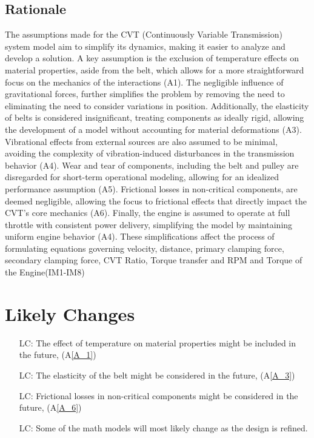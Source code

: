 \documentclass[12pt]{article}
\newcounter{lcnum} %
\begin{document}
\subsection{Rationale}

The assumptions made for the CVT (Continuously Variable Transmission) system model aim to simplify its dynamics, making it easier to analyze and develop a solution. 
A key assumption is the exclusion of temperature effects on material properties, aside from the belt, which allows for a more straightforward focus on the mechanics of the interactions (A1). 
The negligible influence of gravitational forces, further simplifies the problem by removing the need to eliminating the need to consider variations in position. 
Additionally, the elasticity of belts is considered insignificant, treating components as ideally rigid, allowing the development of a model without accounting for material deformations (A3). 
Vibrational effects from external sources are also assumed to be minimal, avoiding the complexity of vibration-induced disturbances in the transmission behavior (A4). 
Wear and tear of components, including the belt and pulley are disregarded for short-term operational modeling, allowing for an idealized performance assumption (A5). 
Frictional losses in non-critical components, are deemed negligible, allowing the focus to frictional effects that directly impact the CVT’s core mechanics (A6). 
Finally, the engine is assumed to operate at full throttle with consistent power delivery, simplifying the model by maintaining uniform engine behavior (A4).
These simplifications affect the process of formulating equations governing velocity, distance, primary clamping force, secondary clamping force, CVT Ratio, Torque transfer and RPM and Torque of the Engine(IM1-IM8)

\section{Likely Changes}    

\noindent \begin{itemize}

\item[LC\refstepcounter{lcnum}\thelcnum\label{LC_1}:] The effect of temperature on material properties might be included in the future, (A\ref{A_1})
\item[LC\refstepcounter{lcnum}\thelcnum\label{LC_2}:] The elasticity of the belt might be considered in the future, (A\ref{A_3})
\item[LC\refstepcounter{lcnum}\thelcnum\label{LC_3}:] Frictional losses in non-critical components might be considered in the future, (A\ref{A_6})
\item[LC\refstepcounter{lcnum}\thelcnum\label{LC_4}:] Some of the math models will most likely change as the design is refined.

\end{itemize}
\end{document}
